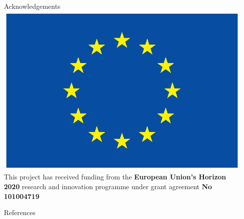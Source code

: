 \documentclass[final]{beamer}
\newlength{\sepwidth}
\newlength{\colwidth}
\newcommand{\separatorcolumn}{\begin{column}{\sepwidth}\end{column}}
\begin{document}
\begin{frame}[t]
\begin{columns}[t]
\begin{column}{\colwidth}
                \begin{block}{Acknowledgements}
                    \includegraphics[height=\baselineskip]{logos/EU_flag_yellow_eps}
                    This project has received funding from the \textbf{European Union’s Horizon 2020} research and
                    innovation programme under grant agreement \textbf{No 101004719}


                \end{block}


                \begin{block}{References}

                    \nocite{*}
                    \footnotesize{}

                \end{block}

            \end{column}
            \separatorcolumn
        \end{columns}

    \end{frame}
\end{document}
